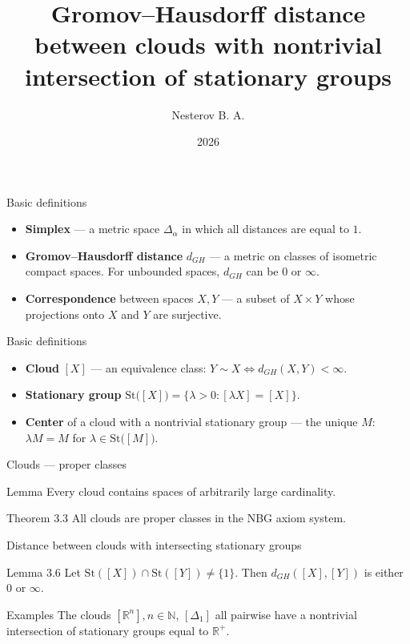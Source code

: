 \documentclass[12pt]{beamer}
\title[Gromov--Hausdorff distance between clouds...]{Gromov--Hausdorff distance
  between clouds with nontrivial
intersection of stationary groups}
\author{Nesterov B. A.}
\date{2026}
\begin{document}
\frame{\titlepage}

\begin{frame}{Basic definitions}
  \begin{itemize}
    \item \textbf{Simplex} --- a metric space \( \Delta _ \alpha
      \) in which all distances are equal to \( 1 \).
    \item \textbf{Gromov--Hausdorff distance} $d_{GH}$ --- a metric on
      classes of isometric compact spaces. For unbounded
      spaces, $d_{GH}$ can be \( 0 \) or $\infty$.
    \item \textbf{Correspondence} between spaces \( X, Y \) ---
      a subset of \( X \times Y \) whose projections onto \( X \) and
      \( Y \) are surjective.
  \end{itemize}
\end{frame}
\begin{frame}{Basic definitions}
  \begin{itemize}
    \item \textbf{Cloud} $[X]$ --- an equivalence class: $Y\sim X \iff
      d_{GH}(X,Y)<\infty$.
    \item \textbf{Stationary group} $\mathrm{St}\big([X]\big) =
      \bigl\{\lambda>0
      : [\lambda X]=[X]\bigr\}$.
    \item \textbf{Center} of a cloud with a nontrivial stationary
      group --- the unique
      $M$: $\lambda M = M$ for $\lambda\in\mathrm{St}\big([M]\big)$.
  \end{itemize}
\end{frame}

\begin{frame}{Clouds --- proper classes}
  \begin{block}{Lemma}
    Every cloud contains spaces of arbitrarily large cardinality.
  \end{block}
  \pause
  \begin{block}{Theorem 3.3}
    All clouds are proper classes in the NBG axiom system.
  \end{block}
\end{frame}

\begin{frame}{Distance between clouds with intersecting stationary groups}
  \begin{block}{Lemma 3.6}
    Let $\mathrm{St}([X])\cap\mathrm{St}([Y])\neq\{1\}$. Then
    $d_{GH}([X],[Y])$ is either $0$ or $\infty$.
  \end{block}
  \pause
  \begin{block}{Examples}
    The clouds \( [\mathbb{R}^n], n \in \mathbb{N} \), \( [\Delta _1] \)
    all pairwise have a
    nontrivial intersection of stationary groups equal to \(
    \mathbb{R}^+ \).
  \end{block}
\end{frame}
\end{document}
